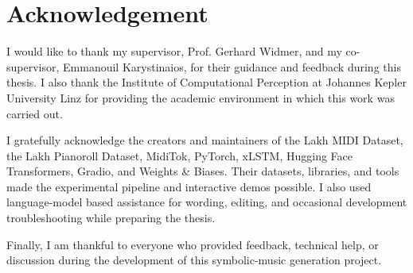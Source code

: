 \section{Acknowledgement}

I would like to thank my supervisor, Prof. Gerhard Widmer, and my co-supervisor,
Emmanouil Karystinaios, for their guidance and feedback during this thesis. I
also thank the Institute of Computational Perception at Johannes Kepler
University Linz for providing the academic environment in which this work was
carried out.

I gratefully acknowledge the creators and maintainers of the Lakh MIDI Dataset,
the Lakh Pianoroll Dataset, MidiTok, PyTorch, xLSTM, Hugging Face Transformers,
Gradio, and Weights \& Biases. Their datasets, libraries, and tools made the
experimental pipeline and interactive demos possible. I also used language-model
based assistance for wording, editing, and occasional development
troubleshooting while preparing the thesis.

Finally, I am thankful to everyone who provided feedback, technical help, or
discussion during the development of this symbolic-music generation project.
